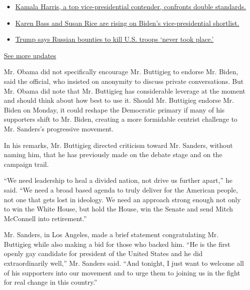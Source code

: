 \begin{itemize}
\tightlist
\item
  \href{https://www.nytimes.com/2020/07/31/us/elections/biden-vs-trump.html?action=click\&pgtype=Article\&state=default\&region=MAIN_CONTENT_1\&context=storylines_live_updates\#link-29fdff45}{Kamala
  Harris, a top vice-presidential contender, confronts double
  standards.}
\item
  \href{https://www.nytimes.com/2020/07/31/us/elections/biden-vs-trump.html?action=click\&pgtype=Article\&state=default\&region=MAIN_CONTENT_1\&context=storylines_live_updates\#link-13ec3d9c}{Karen
  Bass and Susan Rice are rising on Biden's vice-presidential
  shortlist.}
\item
  \href{https://www.nytimes.com/2020/07/31/us/elections/biden-vs-trump.html?action=click\&pgtype=Article\&state=default\&region=MAIN_CONTENT_1\&context=storylines_live_updates\#link-49e9a016}{Trump
  says Russian bounties to kill U.S. troops `never took place.'}
\end{itemize}

\href{https://www.nytimes.com/2020/07/31/us/elections/biden-vs-trump.html?action=click\&pgtype=Article\&state=default\&region=MAIN_CONTENT_1\&context=storylines_live_updates}{See
more updates}

Mr. Obama did not specifically encourage Mr. Buttigieg to endorse Mr.
Biden, said the official, who insisted on anonymity to discuss private
conversations. But Mr. Obama did note that Mr. Buttigieg has
considerable leverage at the moment and should think about how best to
use it. Should Mr. Buttigieg endorse Mr. Biden on Monday, it could
reshape the Democratic primary if many of his supporters shift to Mr.
Biden, creating a more formidable centrist challenge to Mr. Sanders's
progressive movement.

In his remarks, Mr. Buttigieg directed criticism toward Mr. Sanders,
without naming him, that he has previously made on the debate stage and
on the campaign trail.

``We need leadership to heal a divided nation, not drive us further
apart,'' he said. ``We need a broad based agenda to truly deliver for
the American people, not one that gets lost in ideology. We need an
approach strong enough not only to win the White House, but hold the
House, win the Senate and send Mitch McConnell into retirement.''

Mr. Sanders, in Los Angeles, made a brief statement congratulating Mr.
Buttigieg while also making a bid for those who backed him. ``He is the
first openly gay candidate for president of the United States and he did
extraordinarily well,'' Mr. Sanders said. ``And tonight, I just want to
welcome all of his supporters into our movement and to urge them to
joining us in the fight for real change in this country.''


